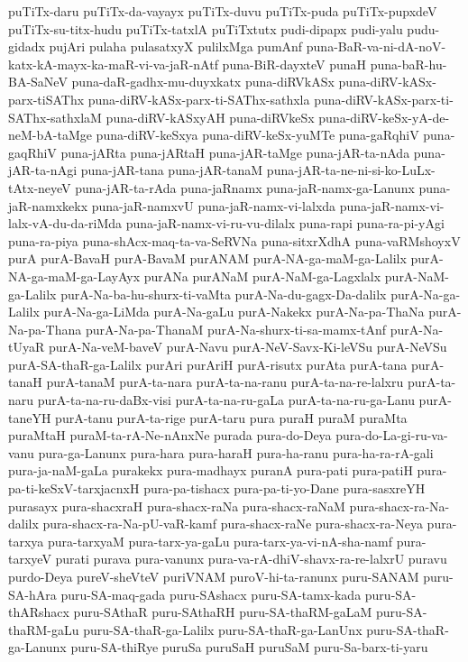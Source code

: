 {puTiTx-daru
puTiTx-da-vayayx
puTiTx-duvu
puTiTx-puda
puTiTx-pupxdeV
puTiTx-su-titx-hudu
puTiTx-tatxlA
puTiTxtutx
pudi-dipapx
pudi-yalu
pudu-gidadx
pujAri
pulaha
pulasatxyX
pulilxMga
pumAnf
puna-BaR-va-ni-dA-noV-katx-kA-mayx-ka-maR-vi-va-jaR-nAtf
puna-BiR-dayxteV
punaH
puna-baR-hu-BA-SaNeV
puna-daR-gadhx-mu-duyxkatx
puna-diRVkASx
puna-diRV-kASx-parx-tiSAThx
puna-diRV-kASx-parx-ti-SAThx-sathxla
puna-diRV-kASx-parx-ti-SAThx-sathxlaM
puna-diRV-kASxyAH
puna-diRVkeSx
puna-diRV-keSx-yA-de-neM-bA-taMge
puna-diRV-keSxya
puna-diRV-keSx-yuMTe
puna-gaRqhiV
puna-gaqRhiV
puna-jARta
puna-jARtaH
puna-jAR-taMge
puna-jAR-ta-nAda
puna-jAR-ta-nAgi
puna-jAR-tana
puna-jAR-tanaM
puna-jAR-ta-ne-ni-si-ko-LuLx-tAtx-neyeV
puna-jAR-ta-rAda
puna-jaRnamx
puna-jaR-namx-ga-Lanunx
puna-jaR-namxkekx
puna-jaR-namxvU
puna-jaR-namx-vi-lalxda
puna-jaR-namx-vi-lalx-vA-du-da-riMda
puna-jaR-namx-vi-ru-vu-dilalx
puna-rapi
puna-ra-pi-yAgi
puna-ra-piya
puna-shAcx-maq-ta-va-SeRVNa
puna-sitxrXdhA
puna-vaRMshoyxV
purA
purA-BavaH
purA-BavaM
purANAM
purA-NA-ga-maM-ga-Lalilx
purA-NA-ga-maM-ga-LayAyx
purANa
purANaM
purA-NaM-ga-Lagxlalx
purA-NaM-ga-Lalilx
purA-Na-ba-hu-shurx-ti-vaMta
purA-Na-du-gagx-Da-dalilx
purA-Na-ga-Lalilx
purA-Na-ga-LiMda
purA-Na-gaLu
purA-Nakekx
purA-Na-pa-ThaNa
purA-Na-pa-Thana
purA-Na-pa-ThanaM
purA-Na-shurx-ti-sa-mamx-tAnf
purA-Na-tUyaR
purA-Na-veM-baveV
purA-Navu
purA-NeV-Savx-Ki-leVSu
purA-NeVSu
purA-SA-thaR-ga-Lalilx
purAri
purAriH
purA-risutx
purAta
purA-tana
purA-tanaH
purA-tanaM
purA-ta-nara
purA-ta-na-ranu
purA-ta-na-re-lalxru
purA-ta-naru
purA-ta-na-ru-daBx-visi
purA-ta-na-ru-gaLa
purA-ta-na-ru-ga-Lanu
purA-taneYH
purA-tanu
purA-ta-rige
purA-taru
pura
puraH
puraM
puraMta
puraMtaH
puraM-ta-rA-Ne-nAnxNe
purada
pura-do-Deya
pura-do-La-gi-ru-va-vanu
pura-ga-Lanunx
pura-hara
pura-haraH
pura-ha-ranu
pura-ha-ra-rA-gali
pura-ja-naM-gaLa
purakekx
pura-madhayx
puranA
pura-pati
pura-patiH
pura-pa-ti-keSxV-tarxjacnxH
pura-pa-tishacx
pura-pa-ti-yo-Dane
pura-sasxreYH
purasayx
pura-shacxraH
pura-shacx-raNa
pura-shacx-raNaM
pura-shacx-ra-Na-dalilx
pura-shacx-ra-Na-pU-vaR-kamf
pura-shacx-raNe
pura-shacx-ra-Neya
pura-tarxya
pura-tarxyaM
pura-tarx-ya-gaLu
pura-tarx-ya-vi-nA-sha-namf
pura-tarxyeV
purati
purava
pura-vanunx
pura-va-rA-dhiV-shavx-ra-re-lalxrU
puravu
purdo-Deya
pureV-sheVteV
puriVNAM
puroV-hi-ta-ranunx
puru-SANAM
puru-SA-hAra
puru-SA-maq-gada
puru-SAshacx
puru-SA-tamx-kada
puru-SA-thARshacx
puru-SAthaR
puru-SAthaRH
puru-SA-thaRM-gaLaM
puru-SA-thaRM-gaLu
puru-SA-thaR-ga-Lalilx
puru-SA-thaR-ga-LanUnx
puru-SA-thaR-ga-Lanunx
puru-SA-thiRye
puruSa
puruSaH
puruSaM
puru-Sa-barx-ti-yaru
}
